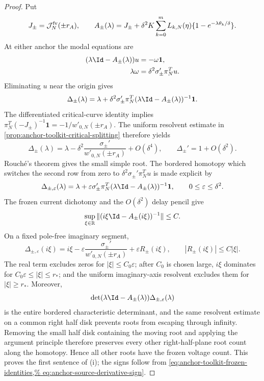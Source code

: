 \begin{proof}
Put
\[
 J_\pm=\mathcal J_N^{\rm fv}(\pm r_A),\qquad
 A_\pm(\lambda)=J_\pm+\delta^2K\sum_{k=0}^mL_{k,N}(\eta)
       \{1-e^{-\lambda\theta_k/\delta}\}.
\]
At either anchor the modal equations are
\begin{align*}
 (\lambda\Id-A_\pm(\lambda))u&=-\omega\mathbf1,\\
 \lambda\omega&=\delta^2\sigma_\pm'\pi_N^Tu.
\end{align*}
Eliminating \(u\) near the origin gives
\[
 \Delta_\pm(\lambda)
 =\lambda+\delta^2\sigma_\pm'\pi_N^T
      (\lambda\Id-A_\pm(\lambda))^{-1}\mathbf1.
\]
The differentiated critical-curve identity implies
\(\pi_N^T(-J_\pm)^{-1}\mathbf1=-1/w'_{0,N}(\pm r_A)\).
The uniform resolvent estimate in
\cref{prop:anchor-toolkit-critical-splitting} therefore yields
\[
 \Delta_\pm(\lambda)
 =\lambda-\delta^2\frac{\sigma_\pm'}{w'_{0,N}(\pm r_A)}
       +O(\delta^4),\qquad \Delta_\pm'=1+O(\delta^2).
\]
Rouch\'{e}'s theorem gives the small simple root.  The bordered homotopy
which switches the second row from zero to
\(\delta^2\sigma_\pm'\pi_N^T u\) is made explicit by
\[
 \Delta_{\pm,\varepsilon}(\lambda)
 =\lambda+\varepsilon\sigma_\pm'\pi_N^T
  (\lambda\Id-A_\pm(\lambda))^{-1}\mathbf1,
 \qquad 0\le\varepsilon\le\delta^2.
\]
The frozen current dichotomy and the \(O(\delta^2)\) delay pencil give
\[
 \sup_{\xi\in\mathbb R}
 \|(i\xi\Id-A_\pm(i\xi))^{-1}\|\le C.
\]
On a fixed pole-free imaginary segment,
\[
 \Delta_{\pm,\varepsilon}(i\xi)
 =i\xi-\varepsilon
   \frac{\sigma_\pm'}{w'_{0,N}(\pm r_A)}
   +\varepsilon R_\pm(i\xi),\qquad
 |R_\pm(i\xi)|\le C|\xi|.
\]
The real term excludes zeros for
\(|\xi|\le C_0\varepsilon\); after \(C_0\) is chosen large, \(i\xi\)
dominates for \(C_0\varepsilon\le|\xi|\le r_*\); and the uniform
imaginary-axis resolvent excludes them for \(|\xi|\ge r_*\).
Moreover,
\[
 \det(\lambda\Id-A_\pm(\lambda))
       \Delta_{\pm,\varepsilon}(\lambda)
\]
is the entire bordered characteristic determinant, and the same resolvent
estimate on a common right half disk prevents roots from escaping through
infinity.  Removing the small half disk containing the moving root and
applying the argument principle therefore preserves every other
right-half-plane root count along the homotopy.  Hence all other roots have
the frozen voltage count.  This proves
the first sentence of (i); the signs follow from
\cref{eq:anchor-toolkit-frozen-identities,%
eq:anchor-source-derivative-sign}.


\end{proof}
